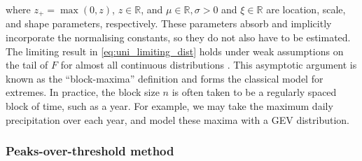 \documentclass{article}
\numberwithin{equation}{section}
\begin{document}
where $z_+ = \max(0, z)$, $z \in \mathbb{R}$, and $\mu \in \mathbb{R}, \sigma > 0$ and $\xi \in \mathbb{R}$ are location, scale, and shape parameters, respectively. 
These parameters absorb and implicitly incorporate the normalising constants, so they do not also have to be estimated. 
The limiting result in \ref{eq:uni_limiting_dist} holds under weak assumptions on the tail of $F$ for almost all continuous distributions \citep{Dupuis2023}. 
This asymptotic argument is known as the ``block-maxima'' definition and forms the classical model for extremes. 
In practice, the block size $n$ is often taken to be a regularly spaced block of time, such as a year. %
For example, we may take the maximum daily precipitation over each year, and model these maxima with a GEV distribution.

\subsubsection{Peaks-over-threshold method} \label{subsubsec:pot}
\end{document}
